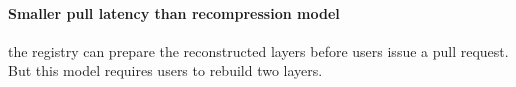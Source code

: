 \paragraph{Smaller pull latency than recompression model} the registry can prepare the reconstructed layers before users issue a pull request. But this model requires users to rebuild two layers.

%
